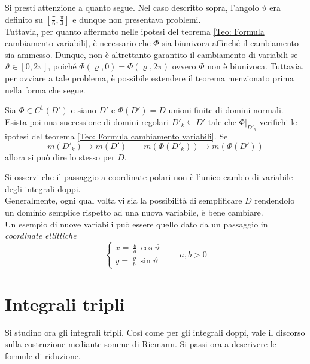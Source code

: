Si presti attenzione a quanto segue. Nel caso descritto sopra, l'angolo $\vartheta$ era definito su $\left[\tfrac{\pi}{6}, \tfrac{\pi}{3}\right]$ e dunque non presentava problemi.\\
Tuttavia, per quanto affermato nelle ipotesi del teorema \ref{Teo: Formula cambiamento variabili}, è necessario che $\Phi$ sia biunivoca affinché il cambiamento sia ammesso. Dunque, non è altrettanto garantito il cambiamento di variabili se $\vartheta \in [0, 2\pi]$, poiché $\Phi(\varrho, 0)=\Phi(\varrho, 2\pi)$ ovvero $\Phi$ non è biunivoca.
Tuttavia, per ovviare a tale problema, è possibile estendere il teorema menzionato prima nella forma che segue.
\begin{theorem}
    Sia $\Phi \in C^1(D')$ e siano $D'$ e $\Phi(D')=D$ unioni finite di domini normali. Esista poi una successione di domini regolari $D'_k \subseteq D'$ tale che $\Phi\big|_{D'_k}$ verifichi le ipotesi del teorema \ref{Teo: Formula cambiamento variabili}. Se
    \begin{equation*}
        m(D'_k) \to m(D') \qquad m(\Phi(D'_k)) \to m(\Phi(D'))
    \end{equation*}
    allora si può dire lo stesso per $D$.
\end{theorem}
\vspace*{6pt}
\begin{oss}
    Si osservi che il passaggio a coordinate polari non è l'unico cambio di variabile degli integrali doppi.\\
    Generalmente, ogni qual volta vi sia la possibilità di semplificare $D$ rendendolo un dominio semplice rispetto ad una nuova variabile, è bene cambiare.\\ 
    Un esempio di nuove variabili può essere quello dato da un passaggio in \textit{coordinate ellittiche}
    \begin{equation*}
        \begin{cases}
            x=\frac{\varrho}{a} \cos \vartheta\\
            y=\frac{\varrho}{b}\sin\vartheta
        \end{cases} \qquad a,b >0
    \end{equation*}
\end{oss}
\section{Integrali tripli}
Si studino ora gli integrali tripli. Così come per gli integrali doppi, vale il discorso sulla costruzione mediante somme di Riemann. 
Si passi ora a descrivere le formule di riduzione.
